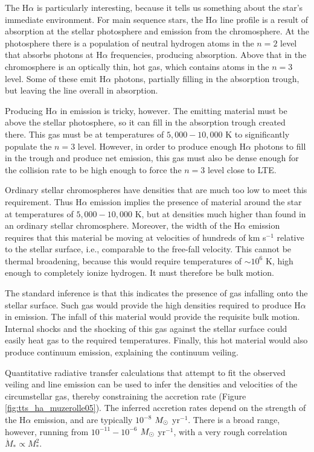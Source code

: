 The H$\alpha$ is particularly interesting, because it tells us something about the star's immediate environment. For main sequence stars, the H$\alpha$ line profile is a result of absorption at the stellar photosphere and emission from the chromosphere. At the photosphere there is a population of neutral hydrogen atoms in the $n=2$ level that absorbs photons at H$\alpha$ frequencies, producing absorption. Above that in the chromosphere is an optically thin, hot gas, which contains atoms in the $n=3$ level. Some of these emit H$\alpha$ photons, partially filling in the absorption trough, but leaving the line overall in absorption.

Producing H$\alpha$ in emission is tricky, however. The emitting material must be above the stellar photosphere, so it can fill in the absorption trough created there. This gas must be at temperatures of $5,000-10,000$ K to significantly populate the $n=3$ level. However, in order to produce enough H$\alpha$ photons to fill in the trough and produce net emission, this gas must also be dense enough for the collision rate to be high enough to force the $n=3$ level close to LTE.

Ordinary stellar chromospheres have densities that are much too low to meet this requirement. Thus H$\alpha$ emission implies the presence of material around the star at temperatures of  $5,000-10,000$ K, but at densities much higher than found in an ordinary stellar chromosphere. Moreover, the width of the H$\alpha$ emission requires that this material be moving at velocities of hundreds of km s$^{-1}$ relative to the stellar surface, i.e., comparable to the free-fall velocity. This cannot be thermal broadening, because this would require temperatures of $\sim 10^6$ K, high enough to completely ionize hydrogen. It must therefore be bulk motion.

The standard inference is that this indicates the presence of gas infalling onto the stellar surface. Such gas would provide the high densities required to produce H$\alpha$ in emission. The infall of this material would provide the requisite bulk motion. Internal shocks and the shocking of this gas against the stellar surface could easily heat gas to the required temperatures. Finally, this hot material would also produce continuum emission, explaining the continuum veiling.

Quantitative radiative transfer calculations that attempt to fit the observed veiling and line emission can be used to infer the densities and velocities of the circumstellar gas, thereby constraining the accretion rate (Figure \ref{fig:tts_ha_muzerolle05}). The inferred accretion rates depend on the strength of the H$\alpha$ emission, and are typically $10^{-8}$ $M_{\odot}$ yr$^{-1}$. There is a broad range, however, running from $10^{-11}-10^{-6}$ $M_{\odot}$ yr$^{-1}$, with a very rough correlation $\dot{M}_*\propto M_*^2$.

